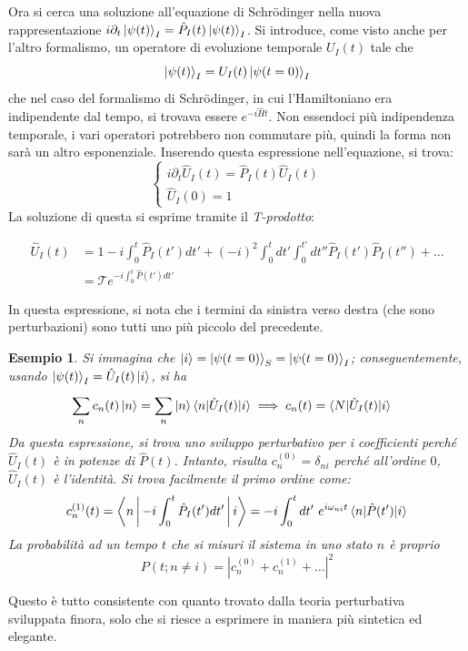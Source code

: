 \documentclass[11pt, a4paper]{scrartcl} %
\numberwithin{equation}{subsection}
\theoremstyle{style2}
\theoremstyle{style1}
\newtheorem{esempio}{Esempio}[section]
\newenvironment{boxenv}[1][]{
    \begin{eqbox}[#1]
    }{
   \end{eqbox}
}
\begin{document}
Ora si cerca una soluzione all'equazione di Schr\"odinger nella nuova rappresentazione $ i \partial _t \ket{\psi (t)} _I = \hat{P}_I (t) \ket{\psi (t)} _I$. 
Si introduce, come visto anche per l'altro formalismo, un operatore di evoluzione temporale $U_I(t)$ tale che 
\[
\ket{\psi (t)} _I = U_I(t) \ket{\psi (t=0)} _I
\] 
che nel caso del formalismo di Schr\"odinger, in cui l'Hamiltoniano era indipendente dal tempo, si trovava essere $e^{-i \hat{H} t} $. 
Non essendoci pi\`u indipendenza temporale, i vari operatori potrebbero non commutare pi\`u, quindi la forma non sar\`a un altro esponenziale.
Inserendo questa espressione nell'equazione, si trova:
\[
	\begin{cases}
		i \partial _t \hat{U}_I(t) = \hat{P}_I(t) \hat{U}_I(t)\\
		\hat{U}_I(0) = 1
	\end{cases}
\] 
La soluzione di questa si esprime tramite il \textit{T-prodotto}:
\begin{boxenv}[]
\begin{equation}
	\begin{split}
		\hat{U}_I(t) &= 1 - i \int_{0} ^t \hat{P}_I(t') dt' + (-i)^2 \int_{0} ^t dt' \int_{0} ^{t'} dt'' \hat{P}_I(t') \hat{P}_I(t'') + \ldots\\
			     &= \mathcal{T}  e^{-i \int_{0} ^t \hat{P}(t') dt'} 
	\end{split}
\end{equation}
\end{boxenv}
\noindent In questa espressione, si nota che i termini da sinistra verso destra (che sono perturbazioni) sono tutti uno pi\`u piccolo del precedente.
\begin{esempio}
Si immagina che $\ket{i} = \ket{\psi (t=0)} _S = \ket{\psi (t=0)} _I$; conseguentemente, usando $\ket{\psi (t)} _I = \hat{U}_I(t) \ket{i} $, si ha
\[
\begin{split}
	&\sum_{n}^{} c_n(t) \ket{n} = \sum_{n}^{} \ket{n} \braket{n|\hat{U}_I(t)|i} \implies c_n(t) = \braket{N|\hat{U}_I(t)|i} 
\end{split}
\] 
Da questa espressione, si trova uno sviluppo perturbativo per i coefficienti perch\'e $\hat{U}_I(t)$ \`e in potenze di $\hat{P}(t)$.
Intanto, risulta $c^{(0)} _n = \delta _{ni} $ perch\'e all'ordine $0$, $\hat{U}_I(t)$ \`e l'identit\`a.
Si trova facilmente il primo ordine come:
\[
c^{(1)} _n (t) = \Braket{n|-i \int_{0} ^t \hat{P}_I(t') dt'|i} = - i \int_{0} ^t dt' \ e^{i \omega_{ni} t} \braket{n|\hat{P}(t')|i} 
\] 
La probabilit\`a ad un tempo $t$ che si misuri il sistema in uno stato $n$ \`e proprio 
\[
P(t; n \neq i) = \left\lvert c_n^{(0)} + c_n^{(1)} + \ldots \right\rvert ^2 
\] 
\end{esempio}
Questo \`e tutto consistente con quanto trovato dalla teoria perturbativa sviluppata finora, solo che si riesce a esprimere in maniera pi\`u sintetica ed elegante.
\end{document}
